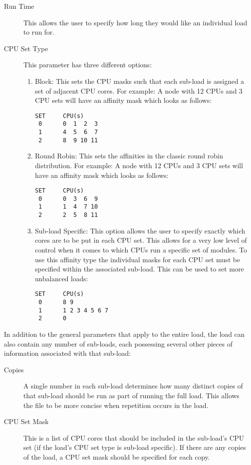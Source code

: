 \begin{description}
	\item [Run Time] This allows the user to specify how long they would like an individual load to run for.
	\item [CPU Set Type] This parameter has three different options: 
	\begin{enumerate}
		\item Block: This sets the CPU masks such that each
		sub-load is assigned a set of adjacent CPU cores. For
		example: A node with 12 CPUs and 3 CPU sets will have
		an affinity mask which looks as follows:

\begin{verbatim}
SET     CPU(s)
 0      0  1  2  3
 1      4  5  6  7
 2      8  9 10 11
\end{verbatim}

		\item Round Robin: This sets the affinities in the
		classic round robin distribution. For example: A node
		with 12 CPUs and 3 CPU sets will have an affinity mask
		which looks as follows:

\begin{verbatim}
SET     CPU(s)
 0      0  3  6  9
 1      1  4  7 10
 2      2  5  8 11
\end{verbatim}

		\item Sub-load Specific: This option allows the user to
		specify exactly which cores are to be put in each CPU
		set. This allows for a very low level of control when it
		comes to which CPUs run a specific set of modules. To use
		this affinity type the individual masks for each CPU set
		must be specified within the associated sub-load. This
		can be used to set more unbalanced loads:

\begin{verbatim}
SET     CPU(s)
 0      8 9
 1      1 2 3 4 5 6 7
 2      0
\end{verbatim}

	\end{enumerate}
\end{description}

In addition to the general parameters that apply to the entire load,
the load can also contain any number of sub-loads, each possessing
several other pieces of information associated with that sub-load:

\begin{description}
	\item [Copies] A single number in each sub-load determines how
	many distinct copies of that sub-load should be run as part of
	running the full load. This allows the file to be more concise
	when repetition occurs in the load. 
	\item [CPU Set Mask] This is a list of CPU cores that should be
	included in the sub-load's CPU set (if the load's CPU set type
	is sub-load specific). If there are any copies of the load,
	a CPU set mask should be specified for each copy.
\end{description}

